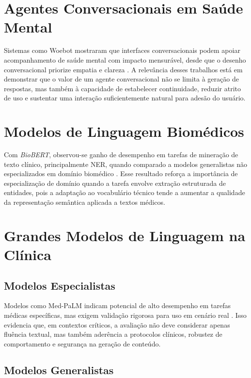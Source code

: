 \section{Agentes Conversacionais em Saúde Mental}

Sistemas como Woebot mostraram que interfaces conversacionais podem apoiar acompanhamento
de saúde mental com impacto mensurável, desde que o desenho conversacional priorize empatia e
clareza \cite{fitzpatrick2017}. A relevância desses trabalhos está em demonstrar que o valor de
um agente conversacional não se limita à geração de respostas, mas também à capacidade de
estabelecer continuidade, reduzir atrito de uso e sustentar uma interação suficientemente
natural para adesão do usuário.

\section{Modelos de Linguagem Biomédicos}

Com \textit{BioBERT}, observou-se ganho de desempenho em tarefas de mineração de texto clínico,
principalmente NER, quando comparado a modelos generalistas não especializados em domínio
biomédico \cite{lee2020}. Esse resultado reforça a importância de especialização de domínio
quando a tarefa envolve extração estruturada de entidades, pois a adaptação ao vocabulário
técnico tende a aumentar a qualidade da representação semântica aplicada a textos médicos.

\section{Grandes Modelos de Linguagem na Clínica}

\subsection{Modelos Especialistas}

Modelos como Med-PaLM indicam potencial de alto desempenho em tarefas médicas específicas,
mas exigem validação rigorosa para uso em cenário real \cite{singhal2023}. Isso evidencia que,
em contextos críticos, a avaliação não deve considerar apenas fluência textual, mas também
aderência a protocolos clínicos, robustez de comportamento e segurança na geração de conteúdo.

\subsection{Modelos Generalistas}

